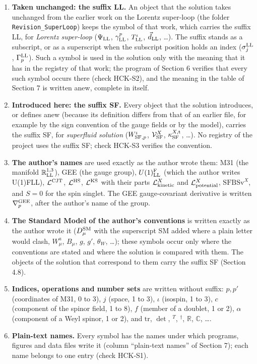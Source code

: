 \documentclass[
  10pt,
]{article}
\providecommand{\tightlist}{%
  \setlength{\itemsep}{0pt}\setlength{\parskip}{0pt}}
\begin{document}
\begin{enumerate}
\def\labelenumi{\arabic{enumi}.}
\tightlist
\item
  \textbf{Taken unchanged: the suffix LL.} An object that the solution
  takes unchanged from the earlier work on the Lorentz super-loop (the
  folder \texttt{Revision\_SuperLoop}) keeps the symbol of that work,
  which carries the suffix LL, for \emph{Lorentz super-loop}
  (\(\Psi_{\rm LL}\), \(\gamma^p_{\rm LL}\), \(T^\iota_{\rm LL}\),
  \(\vec d_{\rm LL}\), \ldots). The suffix stands as a subscript, or as
  a superscript when the subscript position holds an index
  (\(\sigma^{\rm LL}_j\), \(\Gamma^{\rm LL}_p\)). Such a symbol is used
  in the solution only with the meaning that it has in the registry of
  that work; the program of Section 6 verifies that every such symbol
  occurs there (check HCK-S2), and the meaning in the table of Section 7
  is written anew, complete in itself.
\item
  \textbf{Introduced here: the suffix SF.} Every object that the
  solution introduces, or defines anew (because its definition differs
  from that of an earlier file, for example by the sign convention of
  the gauge fields or by the model), carries the suffix SF, for
  \emph{superfluid solution} (\(W^\iota_{{\rm SF},p}\),
  \(\mathcal V^X_{\rm SF}\), \(\kappa^{X,{\rm t}}_{\rm SF}\), \ldots).
  No registry of the project uses the suffix SF; check HCK-S3 verifies
  the convention.
\item
  \textbf{The author's names} are used exactly as the author wrote them:
  M31 (the manifold \(\mathbb R^{1,3}_{\rm LL}\)), GEE (the gauge
  group), \(U(1)^{\rm F}_{\rm LL}\) (which the author writes U(1)FLL),
  \(\mathcal L^{\rm CJT}\), \(\mathcal L^{\rm HS}\),
  \(\mathcal L^{\rm KS}\) with their parts
  \(\mathcal L^X_{\rm kinetic}\) and \(\mathcal L^X_{\rm potential}\),
  \(\mathrm{SFBSv}^X\), and \(S=0\) for the spin singlet. The GEE
  gauge-covariant derivative is written \(\nabla^{\rm GEE}_p\), after
  the author's name of the group.
\item
  \textbf{The Standard Model of the author's conventions} is written
  exactly as the author wrote it (\(D^{\rm SM}_\mu\) with the
  superscript SM added where a plain letter would clash, \(W^a_\mu\),
  \(B_\mu\), \(g\), \(g'\), \(\theta_W\), \ldots); these symbols occur
  only where the conventions are stated and where the solution is
  compared with them. The objects of the solution that correspond to
  them carry the suffix SF (Section 4.8).
\item
  \textbf{Indices, operations and number sets} are written without
  suffix: \(p,p'\) (coordinates of M31, 0 to 3), \(j\) (space, 1 to 3),
  \(\iota\) (isospin, 1 to 3), \(c\) (component of the spinor field, 1
  to 8), \(f\) (member of a doublet, 1 or 2), \(\alpha\) (component of a
  Weyl spinor, 1 or 2), and \(\mathrm{tr}\), \(\det\), \({}^T\),
  \({}^\dagger\), \(\mathbb R\), \(\mathbb C\), \ldots.
\item
  \textbf{Plain-text names.} Every symbol has the names under which
  programs, figures and data files write it (column ``plain-text names''
  of Section 7); each name belongs to one entry (check HCK-S1).
\end{enumerate}
\end{document}
